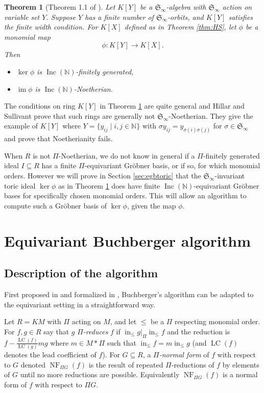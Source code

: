 \documentclass{article}
\theoremstyle{plain}
\newtheorem{theorem}{Theorem}[section]
\theoremstyle{definition}
\numberwithin{equation}{section}
\newcommand{\B}[1]{\mathbb #1}
\newcommand{\F}[1]{\mathfrak #1}
\DeclareMathOperator{\initial}{in}
\DeclareMathOperator{\NF}{NF}
\DeclareMathOperator{\im}{im}
\newcommand{\Inc}{\operatorname{Inc}(\B N)}
\newcommand{\mon}{M}
\newcommand{\Sym}{\F S_\infty}
\newcommand{\LT}{\initial_{\leq}}
\newcommand{\LC}{\operatorname{LC}}
\begin{document}
\begin{theorem}[Theorem 1.1 of \cite{draisma2013noetherianity}]\label{thm:DEKL}
 Let $K[Y]$ be a $\Sym$-algebra with $\Sym$ action on variable set $Y$.  Suppose $Y$ has a finite number of $\Sym$-orbits, and $K[Y]$ satisfies the finite width condition.  For $K[X]$ defined as in Theorem \ref{thm:HS}, let $\phi$ be a monomial map
  \[ \phi: K[Y] \to K[X]. \]
 Then
 \begin{itemize}
  \item $\ker \phi$ is $\Inc$-finitely generated,
  \item $\im \phi$ is $\Inc$-Noetherian.
 \end{itemize}
\end{theorem}

The conditions on ring $K[Y]$ in Theorem \ref{thm:DEKL} are quite general and Hillar and Sullivant \cite{hillar2012finite} prove that such rings are generally not $\Sym$-Noetherian.  They give the example of $K[Y]$ where $Y = \{y_{ij} \mid i, j \in \B N\}$ with $\sigma y_{ij} = y_{\sigma(i)\sigma(j)}$ for $\sigma \in \Sym$ and prove that Noetherianity fails.

When $R$ is not $\Pi$-Noetherian, we do not know in general if a $\Pi$-finitely generated ideal $I\subseteq R$ has a finite $\Pi$-equivariant Gr\"obner basis, or if so, for which monomial orders.  However we will prove in Section \ref{sec:egbtoric} that the $\Sym$-invariant toric ideal $\ker \phi$ as in Theorem \ref{thm:DEKL} does have finite $\Inc$-equivariant Gr\"obner bases for specifically chosen monomial orders.  This will allow an algorithm to compute such a Gr\"obner basis of $\ker \phi$, given the map $\phi$.

\section{Equivariant Buchberger algorithm}
\subsection{Description of the algorithm}
First proposed in \cite{aschenbrenner2007finite} and formalized in \cite{Brouwer09e}, Buchberger's algorithm can be adapted to the equivariant setting in a straightforward way.

Let $R = K\mon$ with $\Pi$ acting on $\mon$, and let $\leq$ be a $\Pi$ respecting monomial order.  For $f,g \in R$ say that $g$ {\em $\Pi$-reduces} $f$ if $\LT g |_{\Pi} \LT f$ and the reduction is $f - \frac{\LC(f)}{\LC(g)}mg$ where $m \in \mon *\Pi$ such that $\LT f = m\LT g$ (and $\LC(f)$ denotes the lead coefficient of $f$).  For $G \subseteq R$, a {\em $\Pi$-normal form} of $f$ with respect to $G$ denoted $\NF_{\Pi G}(f)$ is the result of repeated $\Pi$-reductions of $f$ by elements of $G$ until no more reductions are possible.  Equivalently $\NF_{\Pi G}(f)$ is a normal form of $f$ with respect to $\Pi G$.
\end{document}
